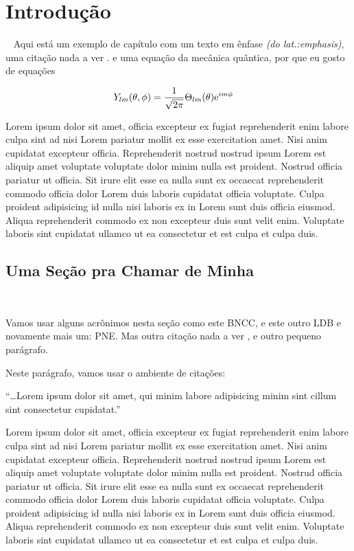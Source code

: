 \chapter{Introdução} %
~\label{cha:Introdução}
Aqui está um exemplo de capítulo com um texto em ênfase \emph{(do lat.:\;emphasis)}, uma citação nada a ver \cite{COLOMBO:2014}. e uma equação da mecânica quântica, por que eu gosto de equações

\begin{align}
  Y_{lm}(\theta,\phi)&=\displaystyle\frac{1}{\sqrt{2\pi}}\Theta_{lm}(\theta)\mathrm{e}^{im\phi}
\end{align}

Lorem ipsum dolor sit amet, officia excepteur ex fugiat reprehenderit enim labore culpa sint ad nisi Lorem pariatur mollit ex esse exercitation amet. Nisi anim cupidatat excepteur officia. Reprehenderit nostrud nostrud ipsum Lorem est aliquip amet voluptate voluptate dolor minim nulla est proident. Nostrud officia pariatur ut officia. Sit irure elit esse ea nulla sunt ex occaecat reprehenderit commodo officia dolor Lorem duis laboris cupidatat officia voluptate. Culpa proident adipisicing id nulla nisi laboris ex in Lorem sunt duis officia eiusmod. Aliqua reprehenderit commodo ex non excepteur duis sunt velit enim. Voluptate laboris sint cupidatat ullamco ut ea consectetur et est culpa et culpa duis.

\section{Uma Seção pra Chamar de Minha} %
~\label{Uma Seção pra Chamar de Minha}

Vamos usar alguns acrônimos nesta seção como este \ac{BNCC}, e este outro \ac{LDB} e novamente mais um: \ac{PNE}. Mas outra citação nada a ver \cite{BRASIL:2017}, e outro pequeno parágrafo.

Neste parágrafo, vamos usar o ambiente de citações:

\begin{citacao}
  ``\ldots Lorem ipsum dolor sit amet, qui minim labore adipisicing minim sint cillum sint consectetur cupidatat.'' 
\end{citacao}

Lorem ipsum dolor sit amet, officia excepteur ex fugiat reprehenderit enim labore culpa sint ad nisi Lorem pariatur mollit ex esse exercitation amet. Nisi anim cupidatat excepteur officia. Reprehenderit nostrud nostrud ipsum Lorem est aliquip amet voluptate voluptate dolor minim nulla est proident. Nostrud officia pariatur ut officia. Sit irure elit esse ea nulla sunt ex occaecat reprehenderit commodo officia dolor Lorem duis laboris cupidatat officia voluptate. Culpa proident adipisicing id nulla nisi laboris ex in Lorem sunt duis officia eiusmod. Aliqua reprehenderit commodo ex non excepteur duis sunt velit enim. Voluptate laboris sint cupidatat ullamco ut ea consectetur et est culpa et culpa duis.

